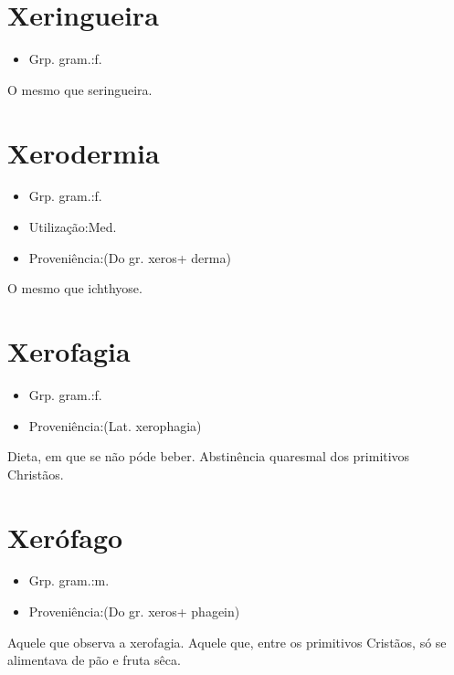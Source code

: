 \section{Xeringueira}
\begin{itemize}
\item {Grp. gram.:f.}
\end{itemize}
O mesmo que \textunderscore seringueira\textunderscore .
\section{Xerodermia}
\begin{itemize}
\item {Grp. gram.:f.}
\end{itemize}
\begin{itemize}
\item {Utilização:Med.}
\end{itemize}
\begin{itemize}
\item {Proveniência:(Do gr. \textunderscore xeros\textunderscore  + \textunderscore derma\textunderscore )}
\end{itemize}
O mesmo que \textunderscore ichthyose\textunderscore .
\section{Xerofagia}
\begin{itemize}
\item {Grp. gram.:f.}
\end{itemize}
\begin{itemize}
\item {Proveniência:(Lat. \textunderscore xerophagia\textunderscore )}
\end{itemize}
Dieta, em que se não póde beber.
Abstinência quaresmal dos primitivos Christãos.
\section{Xerófago}
\begin{itemize}
\item {Grp. gram.:m.}
\end{itemize}
\begin{itemize}
\item {Proveniência:(Do gr. \textunderscore xeros\textunderscore  + \textunderscore phagein\textunderscore )}
\end{itemize}
Aquele que observa a xerofagia.
Aquele que, entre os primitivos Cristãos, só se alimentava de pão e fruta sêca.
